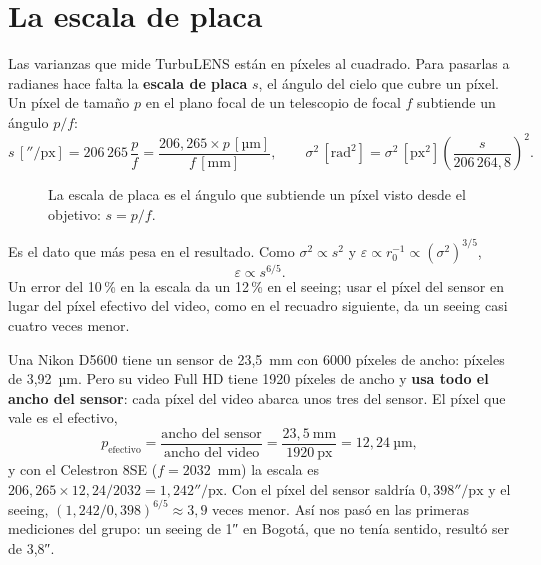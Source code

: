 \section{La escala de placa}\label{sec:escala_teoria}

Las varianzas que mide TurbuLENS están en píxeles al cuadrado. Para pasarlas a radianes hace falta la \textbf{escala de
placa} $s$, el ángulo del cielo que cubre un píxel. Un píxel de tamaño $p$ en el plano focal de un telescopio de focal $f$
subtiende un ángulo $p/f$:
\begin{equation}
s\,[''/\text{px}] = 206\,265\,\frac{p}{f} = \frac{206{,}265 \times p\,[\text{µm}]}{f\,[\text{mm}]},
\qquad
\sigma^2\,[\text{rad}^2] = \sigma^2\,[\text{px}^2]\left(\frac{s}{206\,264{,}8}\right)^2 .
\end{equation}

\begin{figure}[H]
\centering
{}
\caption{La escala de placa es el ángulo que subtiende un píxel visto desde el objetivo: $s = p/f$.}
\end{figure}

Es el dato que más pesa en el resultado. Como $\sigma^2 \propto s^2$ y $\varepsilon \propto r_0^{-1} \propto
(\sigma^2)^{3/5}$,
\begin{equation}
\varepsilon \propto s^{6/5}.
\end{equation}
Un error del 10\,\% en la escala da un 12\,\% en el seeing; usar el píxel del sensor en lugar del píxel efectivo del
video, como en el recuadro siguiente, da un seeing casi cuatro veces menor.

\begin{cuidado}
Una Nikon D5600 tiene un sensor de 23,5~mm con 6000 píxeles de ancho: píxeles de 3,92~µm. Pero su video Full HD tiene
1920 píxeles de ancho y \textbf{usa todo el ancho del sensor}: cada píxel del video abarca unos tres del sensor. El píxel
que vale es el efectivo,
\[
p_\text{efectivo} = \frac{\text{ancho del sensor}}{\text{ancho del video}} = \frac{23{,}5\ \text{mm}}{1920\ \text{px}}
= 12{,}24\ \text{µm},
\]
y con el Celestron 8SE ($f = 2032$~mm) la escala es $206{,}265 \times 12{,}24 / 2032 = 1{,}242''/\text{px}$. Con el píxel
del sensor saldría $0{,}398''/\text{px}$ y el seeing, $(1{,}242/0{,}398)^{6/5} \approx 3{,}9$ veces menor. Así nos pasó
en las primeras mediciones del grupo: un seeing de 1″ en Bogotá, que no tenía sentido, resultó ser de 3,8″.
\end{cuidado}

